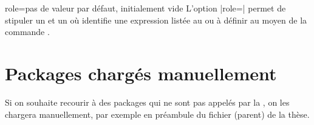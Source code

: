 
\begin{docKey}{role}{=}{pas de valeur par défaut, initialement
    vide}
  L'option |role=| permet de stipuler un  et
  un  où  identifie une expression listée au
   ou à définir au moyen de la commande
  .
\end{docKey}

\section{Packages chargés manuellement}
\label{sec-options-de-classes}
Si on souhaite recourir à des packages qui ne sont pas appelés par la \yatCl{},
on les chargera manuellement, par exemple en préambule du fichier (parent) de
la thèse.

